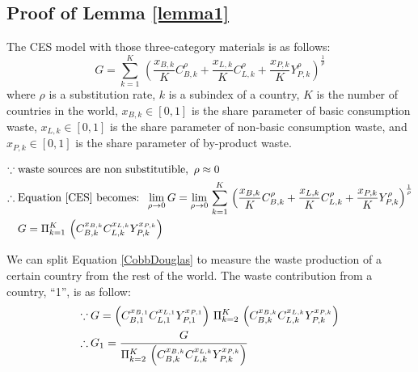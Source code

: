 \documentclass[sn-basic]{sn-jnl}%
\theoremstyle{thmstyleone}%
\theoremstyle{thmstyletwo}%
\theoremstyle{thmstylethree}%
\begin{document}
\begin{appendices}

\section{Proof of Lemma \ref{lemma1}}\label{secA1}

	The CES model with those three-category materials is as follows:
	\begin{equation}
		\label{CES}
		G=\sum_{k=1}^K\,\left( \frac{x_{B,k}}{K}C_{B,k}^\rho + \frac{x_{L,k}}{K}C_{L,k}^\rho  + \frac{x_{P,k}}{K}Y_{P,k}^\rho\right)^\frac{1}{\rho}
	\end{equation}
	where $\rho$ is a substitution rate, $k$ is a subindex of a country, $K$ is the number of countries in the world, $x_{B,k} \in \left[0,1\right]$ is the share parameter of basic consumption waste, $x_{L,k} \in \left[0,1\right]$ is the share parameter of non-basic consumption waste, and $x_{P,k} \in \left[0,1\right]$ is the share parameter of by-product waste.
	
	\begin{align}
		\label{CobbDouglas}
		\because \; &\text{waste sources are non substitutible, } \, \rho \approx 0 \notag\\
		\therefore \;  &\text{Equation \ref{CES} becomes: }\, \lim\limits_{\rho \to 0} G = \lim\limits_{\rho \to 0} \, \sum_{k=1}^K\,\left( \frac{x_{B,k}}{K}C_{B,k}^\rho + \frac{x_{L,k}}{K}C_{L,k}^\rho  + \frac{x_{P,k}}{K}Y_{P,k}^\rho\right)^\frac{1}{\rho} \notag\\
		\; & G= \Pi_{k=1}^K\,\left(C_{B,k}^{x_{B,k}} C_{L,k}^{x_{L,k}} Y_{P,k}^{x_{P,k}} \right)
	\end{align}
	
	We can split Equation \ref{CobbDouglas} to measure the waste production of a certain country from the rest of the world. The waste contribution from a country, “1”, is as follow:
	\begin{align}
		\because \:& G= \left(C_{B,1}^{x_{B,1}} C_{L,1}^{x_{L,1}} Y_{P,1}^{x_{P,1}}\right) \,\Pi_{k=2}^K\,\left(C_{B,k}^{x_{B,k}} C_{L,k}^{x_{L,k}} Y_{P,k}^{x_{P,k}} \right) \notag \\
		\therefore \:& G_1 =\frac{G}{\Pi_{k=2}^K\,\left(C_{B,k}^{x_{B,k}} C_{L,k}^{x_{L,k}} Y_{P,k}^{x_{P,k}} \right)}
	\end{align}
	

\end{appendices}
\end{document}
